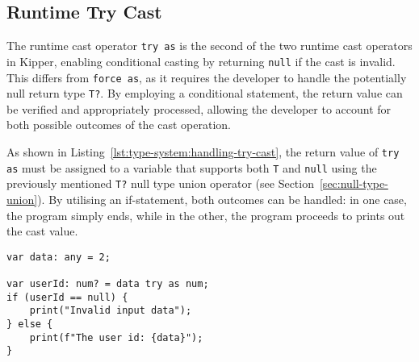 \subsection{Runtime Try Cast}
\label{sec:runtime-try-cast}

The runtime cast operator \lstinline|try as| is the second of the two runtime cast operators in Kipper, enabling conditional casting by returning \lstinline|null| if the cast is invalid. This differs from \lstinline|force as|, as it requires the developer to handle the potentially null return type \lstinline|T?|. By employing a conditional statement, the return value can be verified and appropriately processed, allowing the developer to account for both possible outcomes of the cast operation.

As shown in Listing~\ref{lst:type-system:handling-try-cast}, the return value of \lstinline|try as| must be assigned to a variable that supports both \lstinline|T| and \lstinline|null| using the previously mentioned \lstinline|T?| null type union operator (see Section~\ref{sec:null-type-union}). By utilising an if-statement, both outcomes can be handled: in one case, the program simply ends, while in the other, the program proceeds to prints out the cast value.

\begin{lstlisting}[language=Kipper,caption=Casting an \lstinline|any| type value using the \lstinline|try as| cast operator and handling both possible outcomes,label=lst:type-system:handling-try-cast]
var data: any = 2;

var userId: num? = data try as num; 
if (userId == null) {
	print("Invalid input data");
} else {
	print(f"The user id: {data}");
}
\end{lstlisting}

